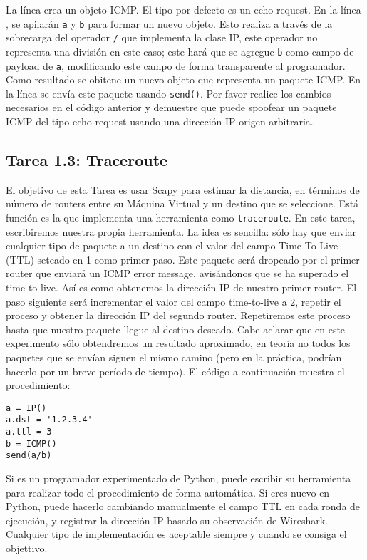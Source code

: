 La línea  crea un objeto ICMP. El tipo por defecto es un echo request. En la línea , se apilarán \texttt{a} y \texttt{b} para formar un nuevo objeto. Esto realiza a través de la sobrecarga del operador \texttt{/} que implementa la clase IP, este operador no representa una división en este caso; este hará que se agregue  \texttt{b} como campo de payload de \texttt{a}, modificando este campo de forma transparente al programador. Como resultado se obitene un nuevo objeto que representa un paquete ICMP. En la línea  se envía este paquete usando \texttt{send()}. Por favor realice los cambios necesarios en el código anterior y demuestre que puede spoofear un paquete ICMP del tipo echo request usando una dirección IP origen arbitraria.


\subsection{Tarea 1.3: Traceroute} 

El objetivo de esta Tarea es usar Scapy para estimar la distancia, en términos de número de routers entre su Máquina Virtual y un destino que se seleccione. Está función es la que implementa una herramienta como \texttt{traceroute}.
En este tarea, escribiremos nuestra propia herramienta. La idea es sencilla: sólo hay que enviar cualquier tipo de paquete a un destino con el valor del campo Time-To-Live (TTL) seteado en 1 como primer paso. Este paquete será dropeado por el primer router que enviará un 
ICMP error message, avisándonos que se ha superado el time-to-live. Así es como obtenemos la dirección IP de nuestro primer router. El paso siguiente será incrementar el valor del campo time-to-live a 2, repetir el proceso y obtener la dirección IP del segundo router. Repetiremos este proceso hasta que nuestro paquete llegue al destino deseado. Cabe aclarar que en este experimento sólo obtendremos un resultado aproximado, en teoría no todos los paquetes que se envían siguen el mismo camino (pero en la práctica, podrían hacerlo por un breve período de tiempo). El código a continuación muestra el procedimiento:


\begin{lstlisting}
a = IP()
a.dst = '1.2.3.4'
a.ttl = 3
b = ICMP()
send(a/b)
\end{lstlisting}

Si es un programador experimentado de Python, puede escribir su herramienta
para realizar todo el procedimiento de forma automática. Si eres nuevo en Python, puede hacerlo cambiando manualmente el campo TTL en cada ronda de ejecución, y registrar la dirección IP basado su observación de Wireshark. Cualquier tipo de implementación es aceptable siempre y cuando se consiga el objettivo.


